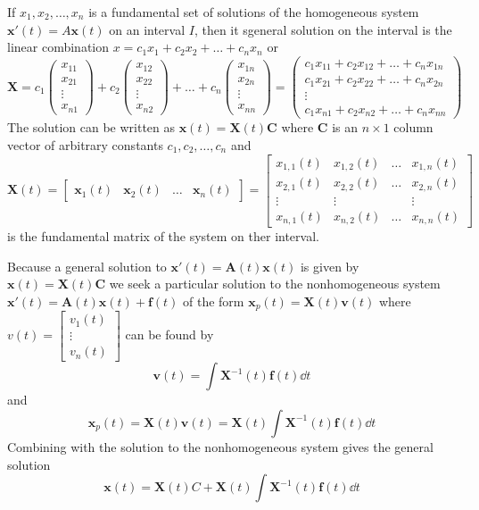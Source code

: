 \documentclass[../diffeq.tex]{subfiles}
\begin{document}
If $x_1,x_2,\dots,x_n$ is a fundamental set of solutions of the homogeneous system $\textbf{x}'(t)=A\textbf{x}(t)$ on an interval $I$, then it sgeneral solution on the interval is the linear combination $x=c_1x_1+c_2x_2+\dots + c_nx_n$ or 
\[ \textbf{X}=c_1\begin{pmatrix}
    x_{11}\\x_{21}\\\vdots\\x_{n1} 
\end{pmatrix}+c_2\begin{pmatrix}
    x_{12}\\x_{22}\\\vdots\\x_{n2}
\end{pmatrix}+\dots + c_n\begin{pmatrix}
    x_{1n}\\x_{2n}\\\vdots\\x_{nn}
\end{pmatrix}=\begin{pmatrix}
    c_1x_{11}+c_2x_{12}+\dots + c_nx_{1n}\\
    c_1x_{21}+c_2x_{22}+\dots + c_nx_{2n}\\
    \vdots \\
    c_1x_{n1}+c_2x_{n2}+\dots + c_nx_{nn}
\end{pmatrix}\]
The solution can be written as $\textbf{x}(t)=\textbf{X}(t)\textbf{C}$ where $\textbf{C}$ is an $n\times 1$ column vector of arbitrary constants $c_1,c_2,\dots,c_n$ and 
\[ \textbf{X}(t)=\begin{bmatrix}
    \textbf{x}_1(t) & \textbf{x}_2(t) & \dots & \textbf{x}_n(t)
\end{bmatrix}=\begin{bmatrix}
    x_{1,1}(t) & x_{1,2}(t) & \dots & x_{1,n}(t) \\
    x_{2,1}(t) & x_{2,2}(t) & \dots & x_{2,n}(t) \\
    \vdots & \vdots & & \vdots \\
    x_{n,1}(t) & x_{n,2}(t) & \dots & x_{n,n}(t)
\end{bmatrix} \]
is the fundamental matrix of the system on ther interval.

Because a general solution to $\textbf{x}'(t)=\textbf{A}(t)\textbf{x}(t)$ is given by $\textbf{x}(t)=\textbf{X}(t)\textbf{C}$ we seek a 
particular solution to the nonhomogeneous system $\textbf{x}'(t)=\textbf{A}(t)\textbf{x}(t)+\textbf{f}(t)$ of the form $\textbf{x}_p(t)=\textbf{X}(t)\textbf{v}(t)$ 
where $v(t)=\begin{bmatrix}
    v_1(t) \\ \vdots \\ v_n(t)
\end{bmatrix}$ can be found by 
\[ \textbf{v}(t)= \int \textbf{X}^{-1}(t)\textbf{f}(t) \dd t \]
and 
\[ \textbf{x}_p(t)=\textbf{X}(t)\textbf{v}(t)=\textbf{X}(t)\int \textbf{X}^{-1}(t)\textbf{f}(t)\dd t \]
Combining with the solution to the nonhomogeneous system gives the general solution 
\[ \textbf{x}(t)=\textbf{X}(t)C+\textbf{X}(t)\int \textbf{X}^{-1}(t)\textbf{f}(t) \dd t \]
\end{document}
